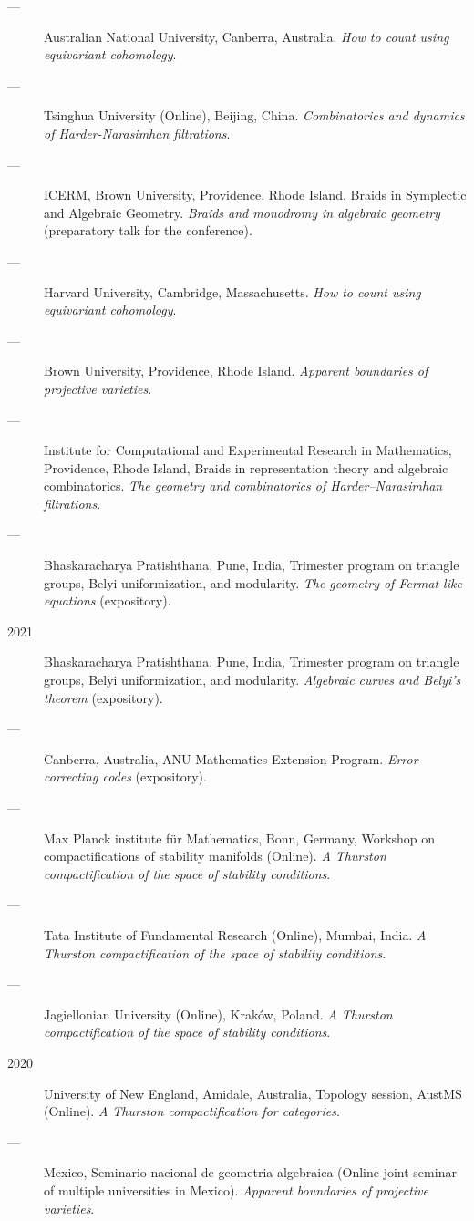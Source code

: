\documentclass[11pt]{article}
\begin{document}
\begin{description}
\item[{---}] Australian National University, Canberra, Australia. \emph{How to count using equivariant cohomology}.
\item[{---}] Tsinghua University (Online), Beijing, China. \emph{Combinatorics and dynamics of Harder-Narasimhan filtrations}.
\item[{---}] ICERM, Brown University, Providence, Rhode Island, Braids in Symplectic and Algebraic Geometry. \emph{Braids and monodromy in algebraic geometry} (preparatory talk for the conference).
\item[{---}] Harvard University, Cambridge, Massachusetts. \emph{How to count using equivariant cohomology}.
\item[{---}] Brown University, Providence, Rhode Island. \emph{Apparent boundaries of projective varieties}.
\item[{---}] Institute for Computational and Experimental Research in Mathematics, Providence, Rhode Island, Braids in representation theory and algebraic combinatorics. \emph{The geometry and combinatorics of Harder--Narasimhan filtrations}.
\item[{---}] Bhaskaracharya Pratishthana, Pune, India, Trimester program on triangle groups, Belyi uniformization, and modularity. \emph{The geometry of Fermat-like equations} (expository).
\item[{2021}] Bhaskaracharya Pratishthana, Pune, India, Trimester program on triangle groups, Belyi uniformization, and modularity. \emph{Algebraic curves and Belyi's theorem} (expository).
\item[{---}] Canberra, Australia, ANU Mathematics Extension Program. \emph{Error correcting codes} (expository).
\item[{---}] Max Planck institute für Mathematics, Bonn, Germany, Workshop on compactifications of stability manifolds (Online). \emph{A Thurston compactification of the space of stability conditions}.
\item[{---}] Tata Institute of Fundamental Research (Online), Mumbai, India. \emph{A Thurston compactification of the space of stability conditions}.
\item[{---}] Jagiellonian University (Online), Kraków, Poland. \emph{A Thurston compactification of the space of stability conditions}.
\item[{2020}] University of New England, Amidale, Australia, Topology session, AustMS (Online). \emph{A Thurston compactification for categories}.
\item[{---}] Mexico, Seminario nacional de geometria algebraica (Online joint seminar of multiple universities in Mexico). \emph{Apparent boundaries of projective varieties}.

\end{description}
\end{document}
